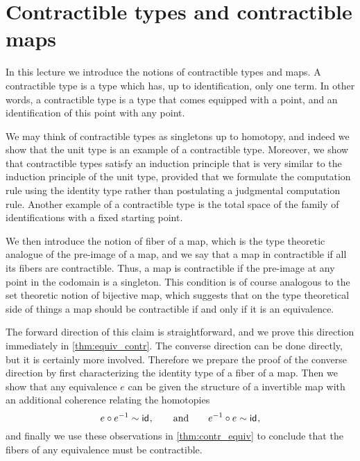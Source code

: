 
\section{Contractible types and contractible maps}

In this lecture we introduce the notions of contractible types and maps. A contractible type is a type which has, up to identification, only one term. In other words, a contractible type is a type that comes equipped with a point, and an identification of this point with any point.

We may think of contractible types as singletons up to homotopy, and indeed we show that the unit type is an example of a contractible type. Moreover, we show that contractible types satisfy an induction principle that is very similar to the induction principle of the unit type, provided that we formulate the computation rule using the identity type rather than postulating a judgmental computation rule. Another example of a contractible type is the total space of the family of identifications with a fixed starting point.

We then introduce the notion of fiber of a map, which is the type theoretic analogue of the pre-image of a map, and we say that a map in contractible if all its fibers are contractible. Thus, a map is contractible if the pre-image at any point in the codomain is a singleton. This condition is of course analogous to the set theoretic notion of bijective map, which suggests that on the type theoretical side of things a map should be contractible if and only if it is an equivalence.

The forward direction of this claim is straightforward, and we prove this direction immediately in \cref{thm:equiv_contr}. The converse direction can be done directly, but it is certainly more involved. Therefore we prepare the proof of the converse direction by first characterizing the identity type of a fiber of a map. Then we show that any equivalence $e$ can be given the structure of a invertible map with an additional coherence relating the homotopies
\begin{equation*}
  e\circ e^{-1}\sim \mathsf{id}_{},\qquad\text{and}\qquad e^{-1}\circ e\sim\mathsf{id}_{},
\end{equation*}
and finally we use these observations in \cref{thm:contr_equiv} to conclude that the fibers of any equivalence must be contractible.

